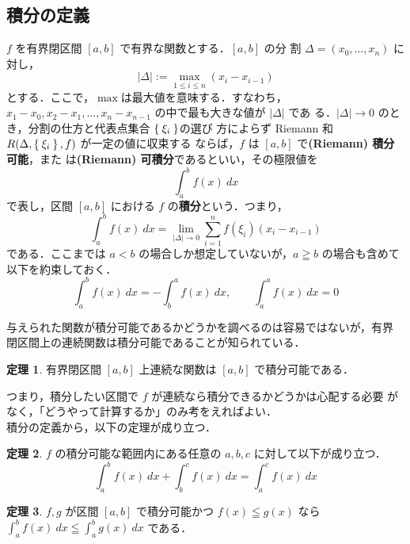 \documentclass[10pt, uplatex, dvipdfmx]{jsarticle}
\theoremstyle{definition}
\newtheorem{theorem}{定理}[section]
\numberwithin{equation}{section}
\newcommand{\ds}{\displaystyle}
\begin{document}
\newpage


\subsection{積分の定義}

$f$ を有界閉区間 $[a,b]$ で有界な関数とする．$[a,b]$ の分
割 $\Delta =(x_0, \ldots, x_n)$ に対し，
\[
  |\Delta| := \max_{1 \leq i \leq n}(x_i - x_{i-1})
\]
とする．ここで，$\max$は最大値を意味する．すなわち，$x_1-x_0, x_2-x_1,
\ldots, x_{n}-x_{n-1}$ の中で最も大きな値が $|\Delta|$ であ
る．$|\Delta| \to 0$ のとき，分割の仕方と代表点集合 $\Set{\xi_i}$の選び
方によらず Riemann 和 $R(\Delta, \Set{\xi_i}, f)$ が一定の値に収束する
ならば，$f$ は $[a,b]$ で\textbf{(Riemann) 積分可能}，また
は\textbf{(Riemann) 可積分}であるといい，その極限値を
\[
  \int_{a}^{b} f(x) \ dx
\]
で表し，区間 $[a,b]$ における $f$ の\textbf{積分}という．つまり，
\[
  \int_{a}^{b} f(x) \ dx = \lim_{|\Delta| \to 0} \sum_{i=1}^{n} f(\xi_i)(x_i-x_{i-1})
\]
である．ここまでは $a<b$ の場合しか想定していないが，$a \geqq b$ の場合も含めて以下を約束しておく．
\begin{equation}\label{eq:int_promis}
  \int_{a}^{b} f (x) \ dx = - \int_{b}^{a} f(x) \ dx, \qquad \int_{a}^{a} f(x) \ dx =0
\end{equation}


与えられた関数が積分可能であるかどうかを調べるのは容易ではないが，有界
閉区間上の連続関数は積分可能であることが知られている．

\begin{theorem}\label{thm:integrable1}
  有界閉区間 $[a,b]$ 上連続な関数は $[a,b]$ で積分可能である．
\end{theorem}

つまり，積分したい区間で $f$ が連続なら積分できるかどうかは心配する必要
がなく，「どうやって計算するか」のみ考をえればよい．\\

積分の定義から，以下の定理が成り立つ．

\begin{theorem}\label{thm:int_additive}
  $f$ の積分可能な範囲内にある任意の $a,b,c$ に対して以下が成り立つ．
  \begin{equation}\label{eq:int_additive}
    \int_{a}^{b} f(x) \ dx + \int_{b}^{c} f(x) \ dx = \int_{a}^{c} f(x) \ dx
  \end{equation}
\end{theorem}

\begin{theorem}\label{thm:int_monotomic}
  $f,g$ が区間 $[a,b]$ で積分可能かつ $f(x) \leqq g(x)$ なら $\ds \int_{a}^{b}f(x) \ dx \leqq \int_{a}^{b} g(x) \ dx$ である．
\end{theorem}
\end{document}
